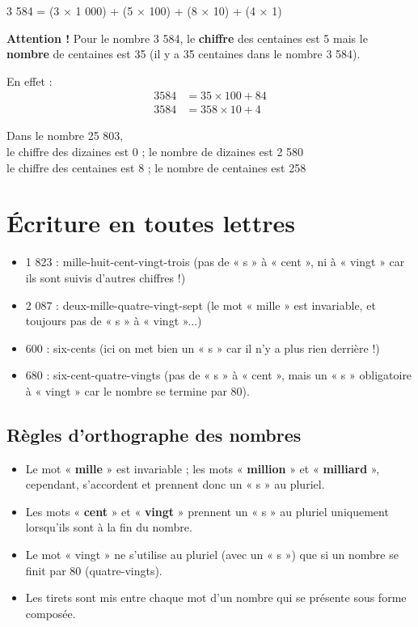 \begin{examplebox}
	3 584 = (3 × 1 000) + (5 × 100) + (8 × 10) + (4 × 1)
\end{examplebox}

\textbf{Attention !} Pour le nombre 3 584, le \textbf{chiffre} des centaines est 5 mais le \textbf{nombre} de centaines est 35 (il y a 35 centaines dans le nombre 3 584).

En effet :
\begin{align*}
	3 584 &= 35 \times 100 + 84\\
	3 584 &= 358 \times 10 + 4
\end{align*}

\begin{examplebox}
	Dans le nombre 25 803,\\ 
	le chiffre des dizaines est 0 ; le nombre de dizaines est 2 580\\
	le chiffre des centaines est 8 ; le nombre de centaines est 258
\end{examplebox}

\section{Écriture en toutes lettres}

\begin{examplebox}
	\begin{itemize}[label = \textbullet]
		\item 1 823 : mille-huit-cent-vingt-trois (pas de « s » à « cent », ni à « vingt » car ils sont suivis d'autres chiffres !)
		\item 2 087 : deux-mille-quatre-vingt-sept (le mot « mille » est invariable, et toujours pas de « s » à « vingt »...)
		\item 600 : six-cents (ici on met bien un « s » car il n'y a plus rien derrière !)
		\item 680 : six-cent-quatre-vingts (pas de « s » à « cent », mais un « s » obligatoire à « vingt » car le nombre se termine par 80).
	\end{itemize}
\end{examplebox}

\subsection{Règles d'orthographe des nombres}

\begin{itemize}
	\item Le mot « \textbf{mille} » est invariable ; les mots « \textbf{million} » et « \textbf{milliard} », cependant, s'accordent et prennent donc un « s » au pluriel.
	\item Les mots « \textbf{cent} » et « \textbf{vingt} » prennent un « s » au pluriel uniquement lorsqu'ils sont à la fin du nombre.
	\item Le mot « vingt » ne s'utilise au pluriel (avec un « s ») que si un nombre se finit par 80 (quatre-vingts).
	\item Les tirets sont mis entre chaque mot d'un nombre qui se présente sous forme composée.
\end{itemize}

